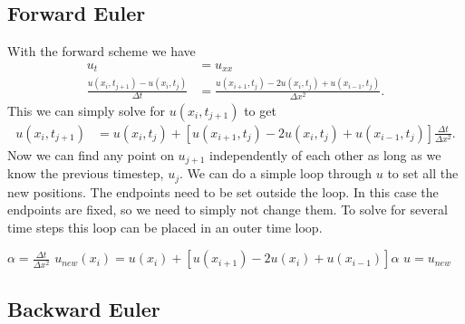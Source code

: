\subsection{Forward Euler}

With the forward scheme we have
\begin{align*}
    u_t &= u_{xx} \\
    \frac{u(x_i, t_{j+1}) - u(x_i, t_j)}{\Delta t}
    &= \frac{u(x_{i+1}, t_j) - 2u(x_i, t_j) + u(x_{i-1}, t_j)}{\Delta x^2}.
\end{align*}
This we can simply solve for $u(x_i, t_{j+1})$ to get
\begin{align*}
    u(x_i, t_{j+1})
    &= u(x_i, t_j)
    +  \left[ u(x_{i+1}, t_j) - 2u(x_i, t_j) + u(x_{i-1}, t_j) \right]
       \frac{\Delta t}{\Delta x^2}.
\end{align*}
Now we can find any point on $u_{j+1}$ independently of each other
as long as we know the previous timestep, $u_j$. We can do a simple
loop through $u$ to set all the new positions. The endpoints need
to be set outside the loop. In this case the endpoints are fixed,
so we need to simply not change them. To solve for several time
steps this loop can be placed in an outer time loop.
\begin{algorithmic}
    \State $ \alpha = \frac{\Delta t}{\Delta x^2} $
            \State $ u_{new}(x_i)
            = u(x_i)
            + \left[
              u(x_{i+1}) - 2u(x_i) + u(x_{i-1})
              \right] \alpha $
        \EndFor
        \State $ u = u_{new} $
    \EndFor
\end{algorithmic}



\subsection{Backward Euler}


